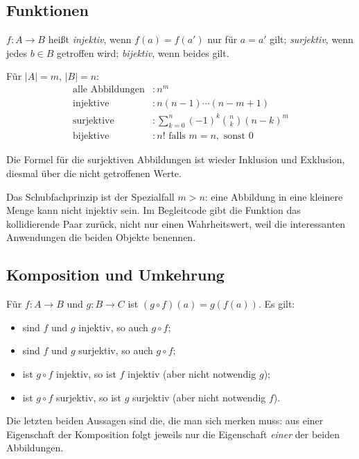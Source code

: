 \documentclass[12pt, a4paper]{article}
\begin{document}
\subsection{Funktionen}

\begin{definitionbox}
$f: A \to B$ heißt \emph{injektiv}, wenn $f(a) = f(a')$ nur für $a = a'$
gilt; \emph{surjektiv}, wenn jedes $b \in B$ getroffen wird; \emph{bijektiv},
wenn beides gilt.
\end{definitionbox}

Für $|A| = m$, $|B| = n$:
\begin{align*}
  \text{alle Abbildungen} &: n^m\\
  \text{injektive} &: n (n-1) \cdots (n-m+1)\\
  \text{surjektive} &: \sum_{k=0}^{n} (-1)^k \binom{n}{k} (n-k)^m\\
  \text{bijektive} &: n! \text{ falls } m = n, \text{ sonst } 0
\end{align*}

Die Formel für die surjektiven Abbildungen ist wieder Inklusion und
Exklusion, diesmal über die nicht getroffenen Werte.

\begin{notebox}
Das Schubfachprinzip ist der Spezialfall $m > n$: eine Abbildung in eine
kleinere Menge kann nicht injektiv sein. Im Begleitcode gibt die Funktion das
kollidierende Paar zurück, nicht nur einen Wahrheitswert, weil die
interessanten Anwendungen die beiden Objekte benennen.
\end{notebox}

\subsection{Komposition und Umkehrung}

Für $f: A \to B$ und $g: B \to C$ ist $(g \circ f)(a) = g(f(a))$. Es gilt:
\begin{itemize}
  \item sind $f$ und $g$ injektiv, so auch $g \circ f$;
  \item sind $f$ und $g$ surjektiv, so auch $g \circ f$;
  \item ist $g \circ f$ injektiv, so ist $f$ injektiv (aber nicht
        notwendig $g$);
  \item ist $g \circ f$ surjektiv, so ist $g$ surjektiv (aber nicht
        notwendig $f$).
\end{itemize}

Die letzten beiden Aussagen sind die, die man sich merken muss: aus einer
Eigenschaft der Komposition folgt jeweils nur die Eigenschaft \emph{einer}
der beiden Abbildungen.
\end{document}
